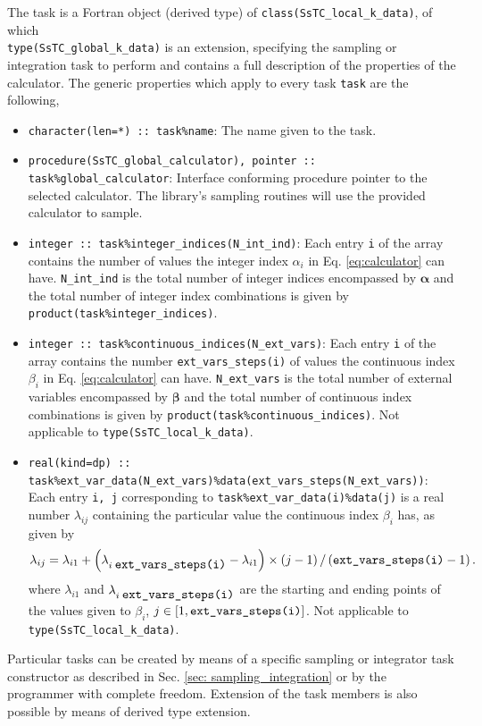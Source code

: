 \documentclass[10pt,a4paper]{article}
\begin{document}
The task is a Fortran object (derived type) of \verb|class(SsTC_local_k_data)|, of which \\ \verb|type(SsTC_global_k_data)| is an extension, specifying the sampling or integration task to perform and contains a full description of the properties of the calculator. The generic properties which apply to every task \verb|task| are the following,
\begin{itemize}
\item \verb|character(len=*) :: task%name|: The name given to the task.
\item \verb|procedure(SsTC_global_calculator), pointer :: task%global_calculator|: Interface conforming procedure pointer to the selected calculator. The library's sampling routines will use the provided calculator to sample.
\item \verb|integer :: task%integer_indices(N_int_ind)|: Each entry \verb|i| of the array contains the number of values the integer index $\alpha_i$ in Eq. \eqref{eq:calculator} can have. \verb|N_int_ind| is the total number of integer indices encompassed by $\bm{\alpha}$ and the total number of integer index combinations is given by \verb|product(task%integer_indices)|.
\item \verb|integer :: task%continuous_indices(N_ext_vars)|: Each entry \verb|i| of the array contains the number \verb|ext_vars_steps(i)| of values the continuous index $\beta_i$ in Eq. \eqref{eq:calculator} can have. \verb|N_ext_vars| is the total number of external variables encompassed by $\bm{\beta}$ and the total number of continuous index combinations is given by \verb|product(task%continuous_indices)|. Not applicable to \verb|type(SsTC_local_k_data)|.
\item \verb|real(kind=dp) :: task%ext_var_data(N_ext_vars)%data(ext_vars_steps(N_ext_vars))|: Each entry \verb|i, j| corresponding to \verb|task%ext_var_data(i)%data(j)| is a real number $\lambda_{ij}$ containing the particular value the continuous index $\beta_{i}$ has, as given by
\begin{equation}\label{eq:disc_cont}
\lambda_{ij} = \lambda_{i1} + \left(\lambda_{i\;\verb|ext_vars_steps(i)|} - \lambda_{i1}\right)\times\left(j - 1\right)/\left(\verb|ext_vars_steps(i)| - 1\right).
\end{equation}
where $\lambda_{i1}$ and $\lambda_{i\;\verb|ext_vars_steps(i)|}$ are the starting and ending points of the values given to $\beta_{i}$, $j\in [1, \verb|ext_vars_steps(i)|]$. Not applicable to \verb|type(SsTC_local_k_data)|.
\end{itemize}
Particular tasks can be created by means of a specific sampling or integrator task constructor as described in Sec. \ref{sec: sampling_integration} or by the programmer with complete freedom. Extension of the task members is also possible by means of derived type extension.
\end{document}
